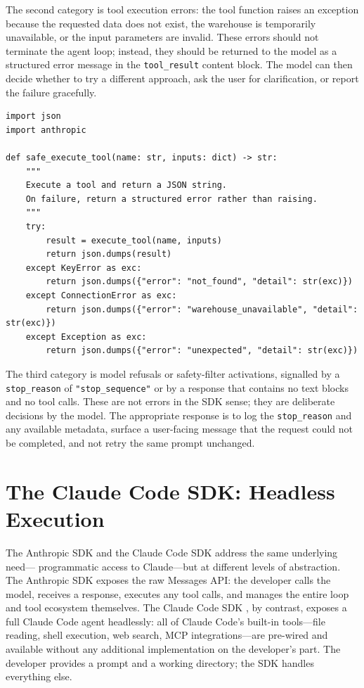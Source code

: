 The second category is tool execution errors: the tool function raises an exception
because the requested data does not exist, the warehouse is temporarily unavailable, or
the input parameters are invalid. These errors should not terminate the agent loop;
instead, they should be returned to the model as a structured error message in the
\texttt{tool\_result} content block. The model can then decide whether to try a
different approach, ask the user for clarification, or report the failure gracefully.

\begin{verbatim}
import json
import anthropic

def safe_execute_tool(name: str, inputs: dict) -> str:
    """
    Execute a tool and return a JSON string.
    On failure, return a structured error rather than raising.
    """
    try:
        result = execute_tool(name, inputs)
        return json.dumps(result)
    except KeyError as exc:
        return json.dumps({"error": "not_found", "detail": str(exc)})
    except ConnectionError as exc:
        return json.dumps({"error": "warehouse_unavailable", "detail": str(exc)})
    except Exception as exc:
        return json.dumps({"error": "unexpected", "detail": str(exc)})
\end{verbatim}

The third category is model refusals or safety-filter activations, signalled by a
\texttt{stop\_reason} of \texttt{"stop\_sequence"} or by a response that contains no
text blocks and no tool calls. These are not errors in the SDK sense; they are
deliberate decisions by the model. The appropriate response is to log the
\texttt{stop\_reason} and any available metadata, surface a user-facing message that
the request could not be completed, and not retry the same prompt unchanged.

\section{The Claude Code SDK: Headless Execution}
\label{app:sdk-commercial:cc-sdk}

The Anthropic SDK and the Claude Code SDK address the same underlying need---
programmatic access to Claude---but at different levels of abstraction. The Anthropic
SDK exposes the raw Messages API: the developer calls the model, receives a response,
executes any tool calls, and manages the entire loop and tool ecosystem themselves.
The Claude Code SDK \citep{anthropic2025ccsdk}, by contrast, exposes a full Claude Code
agent headlessly: all of Claude Code's built-in tools---file reading, shell execution,
web search, MCP integrations---are pre-wired and available without any additional
implementation on the developer's part. The developer provides a prompt and a working
directory; the SDK handles everything else.

